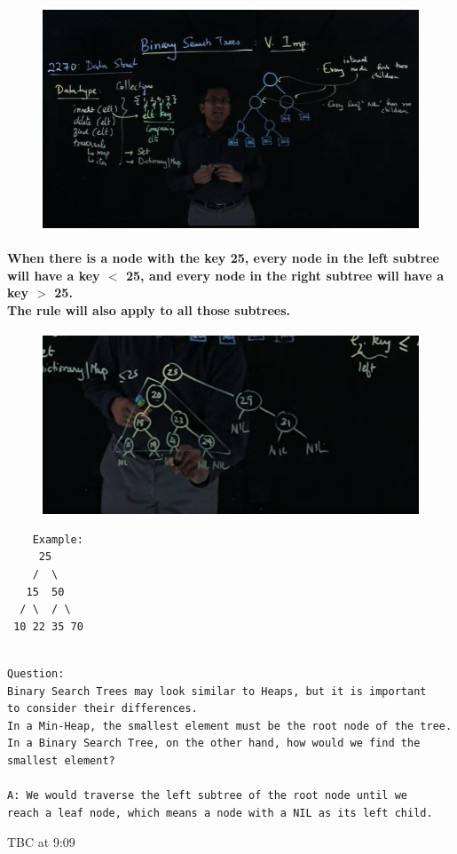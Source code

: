 \documentclass{article}
\begin{document}
\begin{figure}[H]
    \includegraphics[width=\textwidth]{binarysearchtreenodes.png}
\end{figure}

\paragraph{
    When there is a node with the key 25, every node in the left subtree
    will have a key $<$ 25, and every node in the right subtree will
    have a key $>$ 25.\\
    The rule will also apply to all those subtrees.\\
}

\begin{figure}[H]
    \includegraphics[width=\textwidth]{binarysearchtreerealexample.png}
\end{figure}

\begin{verbatim}
    Example:
     25
    /  \
   15  50
  / \  / \
 10 22 35 70
\end{verbatim}

\begin{verbatim}

Question:
Binary Search Trees may look similar to Heaps, but it is important 
to consider their differences.
In a Min-Heap, the smallest element must be the root node of the tree.
In a Binary Search Tree, on the other hand, how would we find the 
smallest element?

A: We would traverse the left subtree of the root node until we 
reach a leaf node, which means a node with a NIL as its left child.
\end{verbatim}

TBC at 9:09
\end{document}
